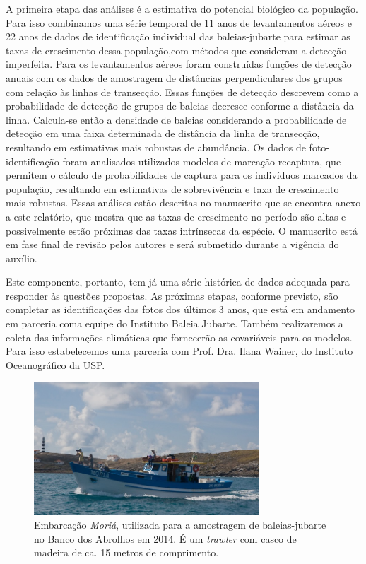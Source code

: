 \documentclass[12pt, A4]{article}
\begin{document}
A primeira etapa das análises é a estimativa do potencial biológico da população.
Para isso combinamos uma série temporal de 11 anos de levantamentos aéreos e 22
anos de dados de identificação individual das baleias-jubarte 
para estimar as taxas de crescimento dessa população,com métodos que consideram a
detecção imperfeita. Para os levantamentos aéreos
foram construídas funções de detecção anuais com os dados de
amostragem de distâncias perpendiculares dos grupos com relação às
linhas de transecção. Essas funções de detecção descrevem como a
probabilidade de detecção de grupos de baleias decresce conforme a
distância da linha. Calcula-se então a densidade de baleias
considerando a probabilidade de detecção em uma faixa determinada de
distância da linha de transecção, resultando em estimativas mais
robustas de abundância. Os dados de foto-identificação foram
analisados utilizados modelos de marcação-recaptura, que permitem o
cálculo de probabilidades de captura para os indivíduos marcados da
população, resultando em estimativas de sobrevivência e taxa de
crescimento mais robustas. Essas análises estão descritas no
manuscrito que se encontra anexo a este relatório, que mostra que
as taxas de crescimento no período são altas e possivelmente estão próximas
das taxas intrínsecas da espécie. O manuscrito está
em fase final de revisão pelos autores e será submetido durante a
vigência do auxílio.

Este componente, portanto, tem já uma série histórica de dados adequada
para responder às questões propostas. As próximas etapas, conforme previsto,
são completar as identificações das fotos dos últimos 3 anos, que está em andamento
em parceria coma equipe do Instituto Baleia Jubarte. 
Também realizaremos a  coleta das informações climáticas 
que fornecerão as covariáveis para os modelos. Para isso estabelecemos uma 
parceria com Prof. Dra. Ilana Wainer, do Instituto Oceanográfico da USP.


\begin{figure}
  \centering
  \includegraphics[width=0.75\textwidth]{figures/crop_Moria2/crop_Moria2.jpg}
  \caption{Embarcação \textit{Moriá}, utilizada para a amostragem de baleias-jubarte no Banco dos Abrolhos em 2014.
    É um \textit{trawler} com casco de madeira de ca. 15 metros de comprimento.}
  \label{fig:baleia1} 
\end{figure}
\end{document}
